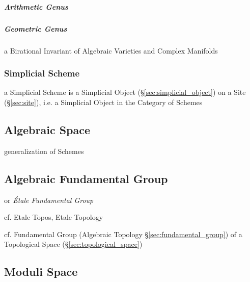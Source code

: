 \subparagraph{Arithmetic Genus}\label{sec:arithmetic_genus}\hfill

\subparagraph{Geometric Genus}\label{sec:geometric_genus}\hfill

a Birational Invariant of Algebraic Varieties and Complex Manifolds



\subsubsection{Simplicial Scheme}\label{sec:simplicial_scheme}

a Simplicial Scheme is a Simplicial Object (\S\ref{sec:simplicial_object}) on a
Site (\S\ref{sec:site}), i.e. a Simplicial Object in the Category of Schemes



\subsection{Algebraic Space}\label{sec:algebraic_space}

generalization of Schemes



\subsection{Algebraic Fundamental Group}\label{sec:algebraic_fundamental_group}

or \emph{\'Etale Fundamental Group}

cf. Etale Topos, Etale Topology

cf. Fundamental Group (Algebraic Topology \S\ref{sec:fundamental_group}) of a
Topological Space (\S\ref{sec:topological_space})



\subsection{Moduli Space}\label{sec:moduli_space}

